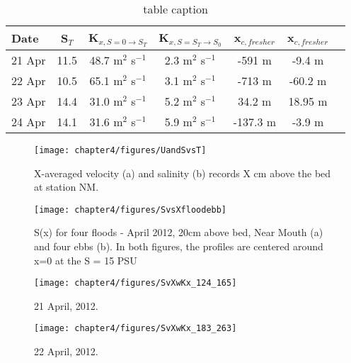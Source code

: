 \begin{table}
\renewcommand{\arraystretch}{1.3}

	\begin{center}
		\begin{tabular}{| l || c | c | c | c | c | c |}
		\hline
		Date & S$_{T}$ & K$_{x,S=0 \rightarrow S_T}$ &  K$_{x,S=S_T \rightarrow S_0}$ & x$_{c,fresher}$ & x$_{c,fresher}$\\
		\hline \hline
		21 Apr & 11.5 & 48.7 m$^2$ s$^{-1}$ & 2.3 m$^2$ s$^{-1}$ & -591 m & -9.4 m\\ 
		22 Apr & 10.5 & 65.1 m$^2$ s$^{-1}$ & 3.1 m$^2$ s$^{-1}$ & -713 m & -60.2 m\\ 
		23 Apr & 14.4 & 31.0 m$^2$ s$^{-1}$ & 5.2 m$^2$ s$^{-1}$ & 34.2 m & 18.95 m\\ 
		24 Apr & 14.1 & 31.6 m$^2$ s$^{-1}$ & 5.9 m$^2$ s$^{-1}$ & -137.3 m & -3.9 m\\  \hline 
	\end{tabular}
	\caption{table caption}\label{tab:Kxtable}
\end{center}
\end{table}






\begin{figure}
	\texttt{[image: chapter4/figures/UandSvsT]} 
\caption{X-averaged velocity (a) and salinity (b) records X cm above the bed at station NM.} \label{fig:UandSvsTch4}
\end{figure}

\begin{figure}
	\texttt{[image: chapter4/figures/SvsXfloodebb]} 
\caption{S(x) for four floods - April 2012, 20cm above bed, Near Mouth (a) and four ebbs (b). In both figures, the profiles are centered around x=0 at the S = 15 PSU} \label{fig:SvsXall}
\end{figure}

\begin{figure}
	\texttt{[image: chapter4/figures/SvXwKx\_124\_165]} 
\caption{21 April, 2012. } \label{fig:Kx421}
\end{figure}

\begin{figure}
	\texttt{[image: chapter4/figures/SvXwKx\_183\_263]} 
\caption{22 April, 2012. } \label{fig:Kx422}
\end{figure}



